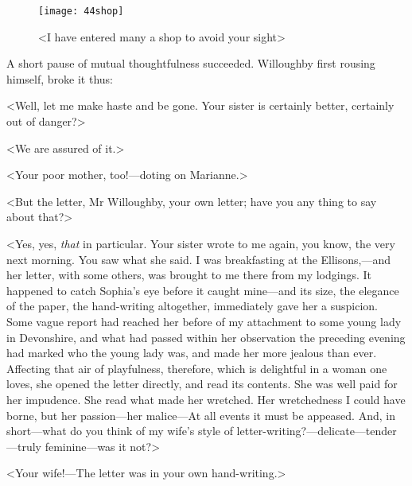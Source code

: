 \begin{letter}
	\begin{figure}[tbph]
		\centering
		\texttt{[image: 44shop]}
		\caption{<I have entered many a shop to avoid your sight>}
	\end{figure}
\end{letter}

A short pause of mutual thoughtfulness succeeded. Willoughby first rousing himself, broke it thus:

<Well, let me make haste and be gone. Your sister is certainly better, certainly out of danger?>

<We are assured of it.>

<Your poor mother, too!—doting on Marianne.>

<But the letter, Mr Willoughby, your own letter; have you any thing to say about that?>

<Yes, yes, \textit{that} in particular. Your sister wrote to me again, you know, the very next morning. You saw what she said. I was breakfasting at the Ellisons,—and her letter, with some others, was brought to me there from my lodgings. It happened to catch Sophia's eye before it caught mine—and its size, the elegance of the paper, the hand-writing altogether, immediately gave her a suspicion. Some vague report had reached her before of my attachment to some young lady in Devonshire, and what had passed within her observation the preceding evening had marked who the young lady was, and made her more jealous than ever. Affecting that air of playfulness, therefore, which is delightful in a woman one loves, she opened the letter directly, and read its contents. She was well paid for her impudence. She read what made her wretched. Her wretchedness I could have borne, but her passion—her malice—At all events it must be appeased. And, in short—what do you think of my wife's style of letter-writing?—delicate—tender—truly feminine—was it not?>

<Your wife!—The letter was in your own hand-writing.>


